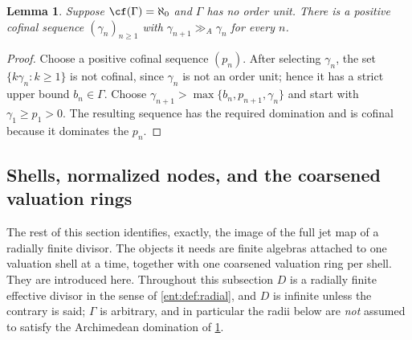 \documentclass[11pt]{article}
\theoremstyle{plain}
\newtheorem{lemma}[lemma]{Lemma}
\theoremstyle{plain}
\theoremstyle{plain}
\theoremstyle{definition}
\theoremstyle{definition}
\theoremstyle{definition}
\theoremstyle{definition}
\theoremstyle{remark}
\newcommand{\ggA}{\mathrel{\gg_{\!A}}}
\begin{document}
\begin{lemma}\label{ent:lem:escaping-classes}
Suppose $\cf(\Gamma)=\aleph_0$ and $\Gamma$ has no order unit. There is a
positive cofinal sequence $(\gamma_n)_{n\ge1}$ with
$\gamma_{n+1}\ggA\gamma_n$ for every $n$.
\end{lemma}
\begin{proof}
Choose a positive cofinal sequence $(p_n)$. After selecting $\gamma_n$, the
set $\{k\gamma_n:k\ge1\}$ is not cofinal, since $\gamma_n$ is not an order
unit; hence it has a strict upper bound $b_n\in\Gamma$. Choose
$\gamma_{n+1}>\max\{b_n,p_{n+1},\gamma_n\}$ and start with
$\gamma_1\ge p_1>0$. The resulting sequence has the required domination and
is cofinal because it dominates the $p_n$.
\end{proof}

\subsection{Shells, normalized nodes, and the coarsened valuation rings}
\label{ent:subsec:shells}
The rest of this section identifies, exactly, the image of the full jet map
of a radially finite divisor. The objects it needs are finite algebras
attached to one valuation shell at a time, together with one coarsened
valuation ring per shell. They are introduced here. Throughout this
subsection $D$ is a radially finite effective divisor in the sense of
\cref{ent:def:radial}, and $D$ is infinite unless the contrary is said;
$\Gamma$ is arbitrary, and in particular the radii below are \emph{not}
assumed to satisfy the Archimedean domination of
\cref{ent:lem:escaping-classes}.
\end{document}
